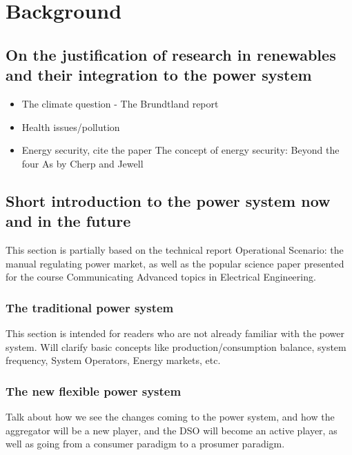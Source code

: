 \chapter{Background} %
\label{cha:background}

\section{On the justification of research in renewables and their integration to the power system} %
\label{sec:justification}
\begin{itemize}
	\item The climate question - The Brundtland report
	\item Health issues/pollution
	\item Energy security, cite the paper The concept of energy security: Beyond the four As by Cherp and Jewell
\end{itemize}


\section{Short introduction to the power system now and in the future} %
\label{sec:powsysdesc}
This section is partially based on the technical report Operational Scenario: the manual regulating power market, as well as the popular science paper presented for the course Communicating Advanced topics in Electrical Engineering.

\subsection{The traditional power system} %
\label{sub:tradpowdesc}

This section is intended for readers who are not already familiar with the power system. Will clarify basic concepts like production/consumption balance, system frequency, System Operators, Energy markets, etc.

\subsection{The new flexible power system} %
\label{sub:newpowdesc}
Talk about how we see the changes coming to the power system, and how the aggregator will be a new player, and the DSO will become an active player, as well as going from a consumer paradigm to a prosumer paradigm.

